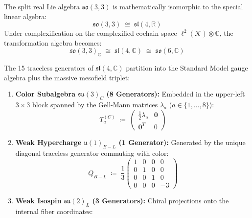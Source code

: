 \documentclass[
    12pt,
    a4paper,
    headings=normal,
    twoside=false,
    open=any,
    parskip=half
]{scrbook}
\begin{document}
The split real Lie algebra $\mathfrak{so}(3,3)$ is mathematically isomorphic to the special linear algebra:
\begin{equation}
\mathfrak{so}(3,3) \;\cong\; \mathfrak{sl}(4, \mathbb{R})
\label{eq:ch8_isomorphism_sl4}
\end{equation}
Under complexification on the complexified cochain space $\ell^2(\mathcal{K}) \otimes \mathbb{C}$, the transformation algebra becomes:
\begin{equation}
\mathfrak{so}(3,3)_\mathbb{C} \;\cong\; \mathfrak{sl}(4, \mathbb{C}) \;\cong\; \mathfrak{so}(6, \mathbb{C})
\label{eq:ch8_complexified_sl4c}
\end{equation}

\begin{phystheorem}\label{thm:ch8_explicit_root_embedding}
The 15 traceless generators of $\mathfrak{sl}(4, \mathbb{C})$ partition into the Standard Model gauge algebra plus the massive mesofield triplet:
\begin{enumerate}[label=(\alph*), noitemsep]
    \item \textbf{Color Subalgebra $\mathfrak{su}(3)_C$ (8 Generators):} Embedded in the upper-left $3 \times 3$ block spanned by the Gell-Mann matrices $\lambda_a$ ($a \in \{1, \dots, 8\}$):
    \begin{equation}
    T_a^{(C)} \;\coloneqq\; \begin{pmatrix} \frac{1}{2}\lambda_a & \mathbf{0} \\ \mathbf{0}^T & 0 \end{pmatrix}
    \end{equation}
    \item \textbf{Weak Hypercharge $\mathfrak{u}(1)_{B-L}$ (1 Generator):} Generated by the unique diagonal traceless generator commuting with color:
    \begin{equation}
    Q_{B-L} \;\coloneqq\; \frac{1}{3} \begin{pmatrix} 1 & 0 & 0 & 0 \\ 0 & 1 & 0 & 0 \\ 0 & 0 & 1 & 0 \\ 0 & 0 & 0 & -3 \end{pmatrix}
    \end{equation}
    \item \textbf{Weak Isospin $\mathfrak{su}(2)_L$ (3 Generators):} Chiral projections onto the internal fiber coordinates:
    \begin{equation}

\end{equation}
\end{enumerate}
\end{phystheorem}
\end{document}
